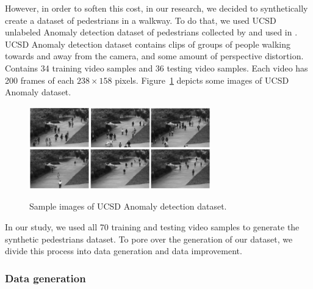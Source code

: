 \indent However, in order to soften this cost, in our research, we decided to synthetically create a dataset of pedestrians in a walkway. To do that, we used UCSD unlabeled Anomaly detection dataset of pedestrians collected by \citeauthor{chan2008privacy} and used in \cite{chan2009analysis, mahadevan2010anomaly, li2014anomaly}. UCSD Anomaly detection dataset contains clips of groups of people walking towards and away from the camera, and some amount of perspective distortion. Contains 34 training video samples and 36 testing video samples. Each video has 200 frames of each $238\times158$ pixels. Figure~\ref{fig:anomaly} depicts some images of UCSD Anomaly dataset.

\begin{figure}[H]
	\centering
	{\includegraphics[width=0.7\textwidth]{images/anomaly}}
	\caption{Sample images of UCSD Anomaly detection dataset.}
	\label{fig:anomaly}
\end{figure}


\indent In our study, we used all 70 training and testing video samples to generate the synthetic pedestrians dataset. To pore over the generation of our dataset, we divide this process into data generation and data improvement.

  
\subsubsection{Data generation}

